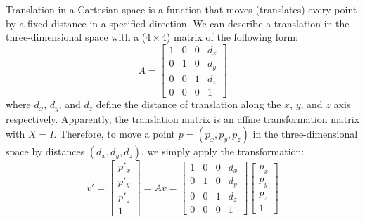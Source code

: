 Translation in a Cartesian space is a function that moves (translates) every point by a fixed distance in a specified direction. We can describe a translation in the three-dimensional space with a ($4\times4$) matrix of the following form:
\[
A = 
\begin{bmatrix}
1 & 0 & 0 & d_x\\
0 & 1 & 0 & d_y\\
0 & 0 & 1 & d_z\\
0 & 0 & 0 & 1
\end{bmatrix}
\]
where $d_x$, $d_y$, and $d_z$ define the distance of translation along the $x$, $y$, and $z$ axis respectively. Apparently, the translation matrix is an affine transformation matrix with $X = I$. Therefore, to move a point $p=(p_x,p_y,p_z)$ in the three-dimensional space by distances $(d_x,d_y,d_z)$, we simply apply the transformation:
\[
v' = 
\begin{bmatrix}
p'_x\\
p'_y\\
p'_z\\
1
\end{bmatrix}
=
Av = 
\begin{bmatrix}
1 & 0 & 0 & d_x\\
0 & 1 & 0 & d_y\\
0 & 0 & 1 & d_z\\
0 & 0 & 0 & 1
\end{bmatrix}
\begin{bmatrix}
p_x\\
p_y\\
p_z\\
1
\end{bmatrix}
\]

